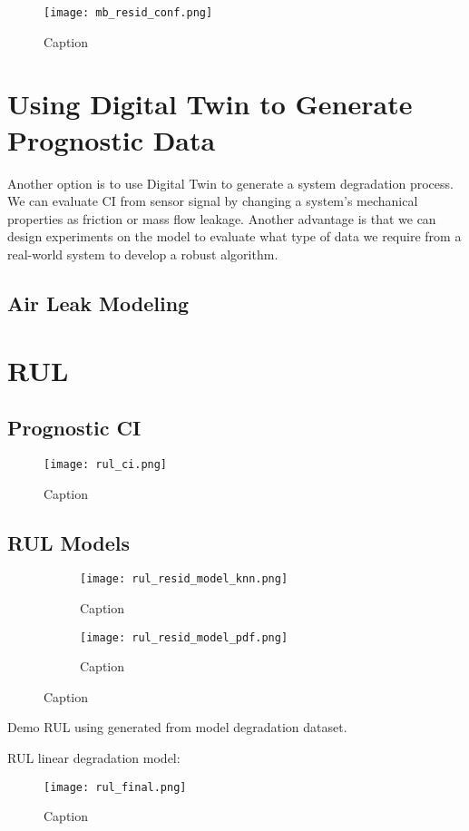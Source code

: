 \begin{figure}[h!]
    \centering
    \texttt{[image: mb\_resid\_conf.png]}
    \caption{Caption}
    \label{fig:}
\end{figure}





\section{Using Digital Twin to Generate Prognostic Data}\label{sec:mb_rul}
Another option is to use Digital Twin to generate a system degradation
process. We can evaluate CI from sensor signal by changing a system's
mechanical properties as friction or mass flow leakage.  Another advantage
is that we can design experiments on the model to evaluate what type of
data we require from a real-world system to develop a robust algorithm.


\subsection{Air Leak Modeling}


\section{RUL}
\subsection{Prognostic CI}
\begin{figure}[h!]
    \centering
    \texttt{[image: rul\_ci.png]}
    \caption{Caption}
    \label{fig:}
\end{figure}


\subsection{RUL Models}

\begin{figure}
    \centering
    \begin{subfigure}[b]{0.55\textwidth}
        \centering
        \texttt{[image: rul\_resid\_model\_knn.png]}
        \caption{Caption}
        \label{fig:}
    \end{subfigure}
    \hfill
    \begin{subfigure}[b]{0.4\textwidth}
        \centering
        \texttt{[image: rul\_resid\_model\_pdf.png]}
        \caption{Caption}
        \label{fig:}
    \end{subfigure}
    \caption{Caption}
    \label{fig:}
\end{figure}


Demo RUL using generated from model degradation dataset.

RUL linear degradation model:
\begin{figure}[h!]
    \centering
    \texttt{[image: rul\_final.png]}
    \caption{Caption}
    \label{fig:}
\end{figure}


\lipsum
